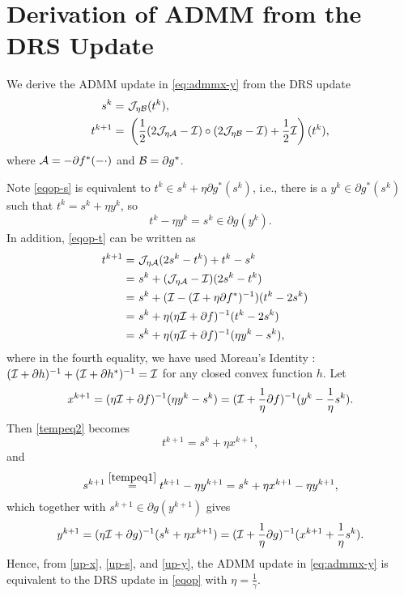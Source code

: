 \section{Derivation of ADMM from the DRS Update}\label{sec:drs-admm}
We derive the ADMM update in \eqref{eq:admmx-y} from the DRS update \begin{subequations}\label{eqop}
\begin{align}
s^k=&\ \cJ_{\eta \cB}(t^k),\label{eqop-s}\\
t^{k+1}=&\ \left(\frac{1}{2}(2\cJ_{\eta\cA}-\cI)\circ(2\cJ_{\eta \cB}-\cI)+\frac{1}{2}\cI\right)(t^k)\label{eqop-t},
\end{align}
\end{subequations} 
where ${\mathcal{A}}=-\partial f^*(-\cdot)$ and ${\mathcal{B}}=\partial g^*$.


Note \eqref{eqop-s} is equivalent to $t^k\in s^k+\eta \partial g^*(s^k)$, i.e., there is a $y^k\in \partial g^*(s^k)$ such that $t^k = s^k+\eta y^k$, so
\begin{equation}\label{tempeq1}
t^k-\eta y^k=s^k\in\partial g(y^k).
\end{equation} 
In addition, \eqref{eqop-t} can be written as
\begin{align}
t^{k+1}=&\ \cJ_{\eta\cA}(2s^k-t^k)+t^k-s^k\cr
=&\ s^k+(\cJ_{\eta\cA}-\cI)(2s^k-t^k)\cr
=&\ s^k+(\cI-(\cI+\eta\partial f^*)^{-1})(t^k-2s^k)\cr
=&\ s^k+\eta(\eta\cI+\partial f)^{-1}(t^k-2s^k)\cr
=&\ s^k+\eta(\eta\cI+\partial f)^{-1}(\eta y^k-s^k),\label{tempeq2}
\end{align} 
where in the fourth equality, we have used Moreau's Identity \cite{rockafellar1997convex}: $({\mathcal{I}}+\partial h)^{-1}+({\mathcal{I}}+\partial h^*)^{-1}={\mathcal{I}}$ for any closed convex function $h$. Let
\begin{equation}\label{up-x}
x^{k+1}=(\eta\cI+\partial f)^{-1}(\eta y^k-s^k)=(\cI+\frac{1}{\eta}\partial f)^{-1}(y^k-\frac{1}{\eta}s^k).
\end{equation}
Then \eqref{tempeq2} becomes
\begin{equation*}
t^{k+1}=s^k+\eta x^{k+1},
\end{equation*}
and 
\begin{equation}\label{up-s}
s^{k+1}\overset{\eqref{tempeq1}}=t^{k+1}-\eta y^{k+1}=s^k+\eta x^{k+1}-\eta y^{k+1},
\end{equation}
which together with $s^{k+1}\in\partial g(y^{k+1})$ gives
\begin{equation}\label{up-y}
y^{k+1}=(\eta\cI+\partial g)^{-1}(s^k+\eta x^{k+1})=(\cI+\frac{1}{\eta}\partial g)^{-1}(x^{k+1}+\frac{1}{\eta}s^k).
\end{equation}
Hence, from \eqref{up-x}, \eqref{up-s}, and \eqref{up-y}, the ADMM update in \eqref{eq:admmx-y} is equivalent to the DRS update in \eqref{eqop} with $\eta=\frac{1}{\gamma}$.
